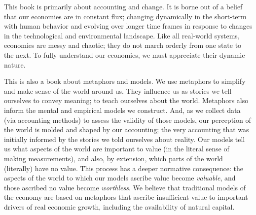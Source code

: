 


This book is primarily about accounting and change.
It is borne out of a belief that our economies are in constant flux;
changing dynamically in the short-term with human behavior
and evolving over longer time frames 
in response to changes in 
the technological and environmental landscape.
Like all real-world systems, 
economies are messy and chaotic;
they do not march orderly from one state to the next.
To fully understand our economies,
we must appreciate their dynamic nature.

This is also a book about metaphors and models.
We use metaphors to simplify and make sense of the world around us.
They influence us as stories we tell ourselves to convey meaning;
to teach ourselves about the world.
Metaphors also inform 
the mental and empirical models we construct.
And, as we collect data (via accounting methods) 
to assess the validity of those models,
our perception of the world is molded and shaped
by our accounting;
the very accounting that was initially informed
by the stories we told ourselves about reality.
Our models tell us what aspects of the world
are important to value 
(in the literal sense of making measurements),
and also, by extension, 
which parts of the world (literally) have no value.
This process has a deeper normative consequence: 
the aspects of the world to which our models ascribe
value become \emph{valuable},
and those ascribed no value become \emph{worthless}.
We believe that traditional models of the economy
are based on metaphors that ascribe insufficient value 
to important drivers of real economic growth,
including the availability of natural capital.


